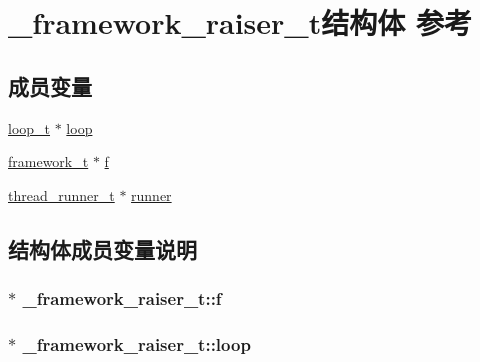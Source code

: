 \hypertarget{a00012}{}\section{\+\_\+framework\+\_\+raiser\+\_\+t结构体 参考}
\label{a00012}
\subsection*{成员变量}
\begin{DoxyCompactItemize}
\item 
\hyperlink{a00051_a9c3ad1cd2de83e09f3a7b59fa82c94ee_a9c3ad1cd2de83e09f3a7b59fa82c94ee}{loop\+\_\+t} $\ast$ \hyperlink{a00012_ad7bf02f3888bf4d1640658b952e61f21_ad7bf02f3888bf4d1640658b952e61f21}{loop}
\item 
\hyperlink{a00051_a6149d769f6f07ed14a40a271c95d8463_a6149d769f6f07ed14a40a271c95d8463}{framework\+\_\+t} $\ast$ \hyperlink{a00012_adfe3d046ff8a8402012e673e3532f06c_adfe3d046ff8a8402012e673e3532f06c}{f}
\item 
\hyperlink{a00051_a9054159cde2f926ef61c28ce1e555199_a9054159cde2f926ef61c28ce1e555199}{thread\+\_\+runner\+\_\+t} $\ast$ \hyperlink{a00012_ac0f82106ba3dd69995f8ba75e8ac9c45_ac0f82106ba3dd69995f8ba75e8ac9c45}{runner}
\end{DoxyCompactItemize}


\subsection{结构体成员变量说明}
\hypertarget{a00012_adfe3d046ff8a8402012e673e3532f06c_adfe3d046ff8a8402012e673e3532f06c}{}
\subsubsection[{f}]{$\ast$ \+\_\+framework\+\_\+raiser\+\_\+t\+::f}\label{a00012_adfe3d046ff8a8402012e673e3532f06c_adfe3d046ff8a8402012e673e3532f06c}
\hypertarget{a00012_ad7bf02f3888bf4d1640658b952e61f21_ad7bf02f3888bf4d1640658b952e61f21}{}
\subsubsection[{loop}]{$\ast$ \+\_\+framework\+\_\+raiser\+\_\+t\+::loop}\label{a00012_ad7bf02f3888bf4d1640658b952e61f21_ad7bf02f3888bf4d1640658b952e61f21}
\hypertarget{a00012_ac0f82106ba3dd69995f8ba75e8ac9c45_ac0f82106ba3dd69995f8ba75e8ac9c45}{}
